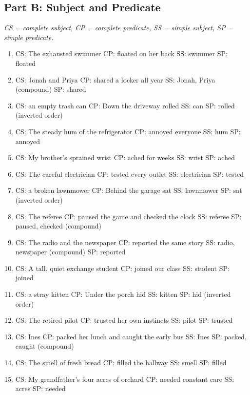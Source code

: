 \documentclass[11pt]{article}
\begin{document}
\subsection*{Part B: Subject and Predicate}
\textit{CS = complete subject, CP = complete predicate, SS = simple subject, SP = simple predicate.}
\begin{enumerate}
  \item CS: The exhausted swimmer \quad CP: floated on her back \quad SS: swimmer \quad SP: floated
  \item CS: Jonah and Priya \quad CP: shared a locker all year \quad SS: Jonah, Priya (compound) \quad SP: shared
  \item CS: an empty trash can \quad CP: Down the driveway rolled \quad SS: can \quad SP: rolled \quad (inverted order)
  \item CS: The steady hum of the refrigerator \quad CP: annoyed everyone \quad SS: hum \quad SP: annoyed
  \item CS: My brother's sprained wrist \quad CP: ached for weeks \quad SS: wrist \quad SP: ached
  \item CS: The careful electrician \quad CP: tested every outlet \quad SS: electrician \quad SP: tested
  \item CS: a broken lawnmower \quad CP: Behind the garage sat \quad SS: lawnmower \quad SP: sat \quad (inverted order)
  \item CS: The referee \quad CP: paused the game and checked the clock \quad SS: referee \quad SP: paused, checked (compound)
  \item CS: The radio and the newspaper \quad CP: reported the same story \quad SS: radio, newspaper (compound) \quad SP: reported
  \item CS: A tall, quiet exchange student \quad CP: joined our class \quad SS: student \quad SP: joined
  \item CS: a stray kitten \quad CP: Under the porch hid \quad SS: kitten \quad SP: hid \quad (inverted order)
  \item CS: The retired pilot \quad CP: trusted her own instincts \quad SS: pilot \quad SP: trusted
  \item CS: Ines \quad CP: packed her lunch and caught the early bus \quad SS: Ines \quad SP: packed, caught (compound)
  \item CS: The smell of fresh bread \quad CP: filled the hallway \quad SS: smell \quad SP: filled
  \item CS: My grandfather's four acres of orchard \quad CP: needed constant care \quad SS: acres \quad SP: needed
\end{enumerate}
\end{document}
